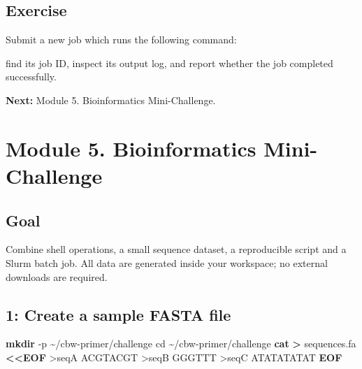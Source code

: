 \documentclass[
]{book}
\newenvironment{Shaded}{\begin{snugshade}}{\end{snugshade}}
\newcommand{\AttributeTok}[1]{\textcolor[rgb]{0.13,0.29,0.53}{#1}}
\newcommand{\BuiltInTok}[1]{#1}
\newcommand{\FunctionTok}[1]{\textcolor[rgb]{0.13,0.29,0.53}{\textbf{#1}}}
\newcommand{\NormalTok}[1]{#1}
\newcommand{\OperatorTok}[1]{\textcolor[rgb]{0.81,0.36,0.00}{\textbf{#1}}}
\newcommand{\StringTok}[1]{\textcolor[rgb]{0.31,0.60,0.02}{#1}}
\begin{document}
\section{Exercise}\label{exercise-2}

Submit a new job which runs the following command:

\begin{Shaded}
\end{Shaded}

find its job ID, inspect its output log, and report whether the job completed successfully.

\textbf{Next:} Module 5. Bioinformatics Mini-Challenge.

\chapter{Module 5. Bioinformatics Mini-Challenge}\label{module-5.-bioinformatics-mini-challenge}

\section{Goal}\label{goal}

Combine shell operations, a small sequence dataset, a reproducible script and a Slurm batch job. All data are generated inside your workspace; no external downloads are required.

\section{1: Create a sample FASTA file}\label{create-a-sample-fasta-file}

\begin{Shaded}
\begin{Highlighting}[]
\FunctionTok{mkdir} \AttributeTok{{-}p}\NormalTok{ \textasciitilde{}/cbw{-}primer/challenge}
\BuiltInTok{cd}\NormalTok{ \textasciitilde{}/cbw{-}primer/challenge}
\FunctionTok{cat} \OperatorTok{\textgreater{}}\NormalTok{ sequences.fa }\OperatorTok{\textless{}\textless{}\textquotesingle{}EOF\textquotesingle{}}
\StringTok{\textgreater{}seqA}
\StringTok{ACGTACGT}
\StringTok{\textgreater{}seqB}
\StringTok{GGGTTT}
\StringTok{\textgreater{}seqC}
\StringTok{ATATATATAT}
\OperatorTok{EOF}
\end{Highlighting}
\end{Shaded}
\end{document}
